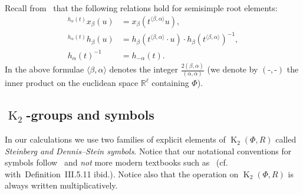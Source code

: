 \documentclass[oneside, 8pt]{amsart}
\theoremstyle{remark}
\theoremstyle{definition}
\numberwithin{lemma}{section}
\numberwithin{prop}{section}
\numberwithin{corollary}{section}
\numberwithin{externaltheorem}{section}
\DeclareMathOperator{\K}{K}
\numberwithin{equation}{section}
\begin{document}
Recall from~\cite[Lemma~5.2]{Ma69} that the following relations hold for semisimple root elements:
\begin{align} \label{eq:conj-h-x} {}^{h_\alpha(t)}\!x_\beta(u) & = x_\beta(t^{\langle \beta,  \alpha \rangle}u), \\
              \label{eq:conj-h-h} {}^{h_\alpha(t)}\!h_\beta(u) & = h_\beta(t^{\langle \beta, \alpha \rangle} \cdot u) \cdot h_\beta(t^{\langle \beta,  \alpha \rangle})^{-1}, \\
              \label{eq:h-inv}    h_\alpha(t)^{-1}             & = h_{-\alpha}(t). \end{align}
In the above formulae $\langle \beta, \alpha \rangle$ denotes the integer $\tfrac{2(\beta, \alpha)}{(\alpha, \alpha)}$ (we denote by $(\text{-},\text{-})$ the inner product on the euclidean space $\mathbb{R}^\ell$ containing $\Phi$).

\subsection{\texorpdfstring{$\K_2$}{K2}-groups and symbols} In our calculations we use two families of explicit elements of $\K_2(\Phi, R)$ called {\it Steinberg and Dennis--Stein symbols}. Notice that our notational conventions for symbols follow~\cite{DS73} and {\it not} more modern textbooks such as~\cite{Kbook} (cf. with~Definition~III.5.11 ibid.). Notice also that the operation on $\K_2(\Phi, R)$ is always written multiplicatively.
\end{document}
